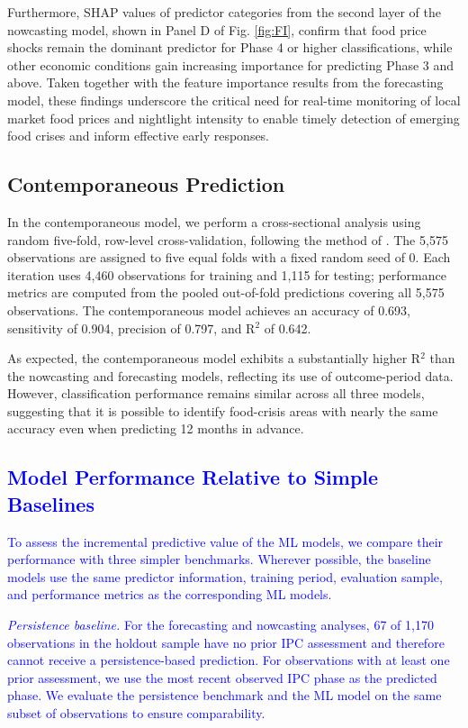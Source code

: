 \documentclass[pdflatex,sn-mathphys-num]{sn-jnl}%
\theoremstyle{thmstyleone}%
\theoremstyle{thmstyletwo}%
\theoremstyle{thmstylethree}%
\begin{document}
Furthermore, SHAP values of predictor categories from the second layer of the nowcasting model, shown in Panel D of Fig. \ref{fig:FI}, confirm that food price shocks remain the dominant predictor for Phase 4 or higher classifications, while other economic conditions gain increasing importance for predicting Phase 3 and above. Taken together with the feature importance results from the forecasting model, these findings underscore the critical need for real-time monitoring of local market food prices and nightlight intensity to enable timely detection of emerging food crises and inform effective early responses.


\subsection*{Contemporaneous Prediction}

In the contemporaneous model, we perform a cross-sectional analysis using random five-fold, row-level cross-validation, following the method of \cite{yeh2020using}. The 5,575 observations are assigned to five equal folds with a fixed random seed of 0. Each iteration uses 4,460 observations for training and 1,115 for testing; performance metrics are computed from the pooled out-of-fold predictions covering all 5,575 observations. The contemporaneous model achieves an accuracy of 0.693, sensitivity of 0.904, precision of 0.797, and R$^2$ of 0.642.

As expected, the contemporaneous model exhibits a substantially higher R$^{2}$  than the nowcasting and forecasting models, reflecting its use of outcome-period data. However, classification performance remains similar across all three models, suggesting that it is possible to identify food-crisis areas with nearly the same accuracy even when predicting 12 months in advance.

\subsection*{\textcolor{blue}{Model Performance Relative to Simple Baselines}}

\textcolor{blue}{To assess the incremental predictive value of the ML models, we compare their performance with three simpler benchmarks. Wherever possible, the baseline models use the same predictor information, training period, evaluation sample, and performance metrics as the corresponding ML models.}

\textcolor{blue}{\textit{Persistence baseline.} For the forecasting and nowcasting analyses, 67 of 1,170 observations in the holdout sample have no prior IPC assessment and therefore cannot receive a persistence-based prediction. For observations with at least one prior assessment, we use the most recent observed IPC phase as the predicted phase. We evaluate the persistence benchmark and the ML model on the same subset of observations to ensure comparability.}
\end{document}
